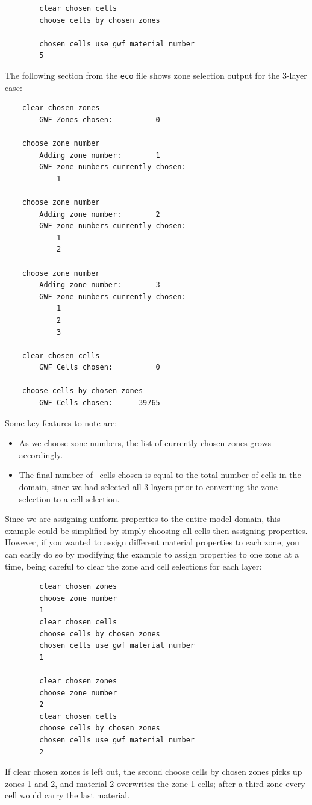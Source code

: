 {\begin{verbatim}
        clear chosen cells
        choose cells by chosen zones

        chosen cells use gwf material number
        5
\end{verbatim}

The following section from the \texttt{eco} file shows zone selection output for the 3-layer case:
\begin{verbatim}
    clear chosen zones
    	GWF Zones chosen:          0

    choose zone number
    	Adding zone number:        1
    	GWF zone numbers currently chosen:
    	    1

    choose zone number
    	Adding zone number:        2
    	GWF zone numbers currently chosen:
    	    1
    	    2

    choose zone number
    	Adding zone number:        3
    	GWF zone numbers currently chosen:
    	    1
    	    2
    	    3

    clear chosen cells
    	GWF Cells chosen:          0

    choose cells by chosen zones
    	GWF Cells chosen:      39765
\end{verbatim}

Some key features to note are:
\begin{itemize}
    \item As we choose zone numbers, the list of currently chosen zones grows accordingly.
    \item The final number of \gwf\ cells chosen is equal to the total number of cells in the domain, since we had selected all 3 layers prior to converting the  zone selection to a cell selection.
\end{itemize}
Since we are assigning uniform properties to the entire model domain, this example could be simplified by simply choosing all cells then assigning properties.  However, if you wanted to assign different material properties to each zone, you can easily do so by modifying the example to assign properties to one zone at a time, being careful to clear the zone and cell selections for each layer:
\begin{verbatim}
        clear chosen zones
        choose zone number
        1
        clear chosen cells
        choose cells by chosen zones
        chosen cells use gwf material number
        1

        clear chosen zones
        choose zone number
        2
        clear chosen cells
        choose cells by chosen zones
        chosen cells use gwf material number
        2
\end{verbatim}
If {\sf clear chosen zones} is left out, the second {\sf choose cells by chosen zones} picks up zones 1 and 2, and material 2 overwrites the zone 1 cells; after a third zone every cell would carry the last material.

}
